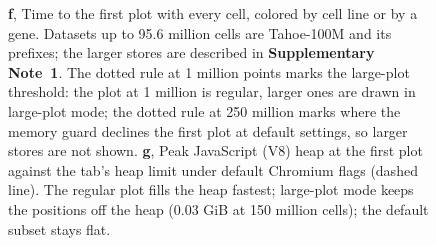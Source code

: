 {\begin{figure}[t]
{%
\textbf{f}, Time to the first plot with every cell, colored by cell line or by a gene. Datasets up to 95.6 million cells are Tahoe-100M and its prefixes; the larger stores are described in \textbf{Supplementary Note~1}. The dotted rule at 1 million points marks the large-plot threshold: the plot at 1 million is regular, larger ones are drawn in large-plot mode; the dotted rule at 250 million marks where the memory guard declines the first plot at default settings, so larger stores are not shown.
\textbf{g}, Peak JavaScript (V8) heap at the first plot against the tab's heap limit under default Chromium flags (dashed line). The regular plot fills the heap fastest; large-plot mode keeps the positions off the heap (0.03 GiB at 150 million cells); the default subset stays flat.
}
\label{fig:scale}
\end{figure}}

